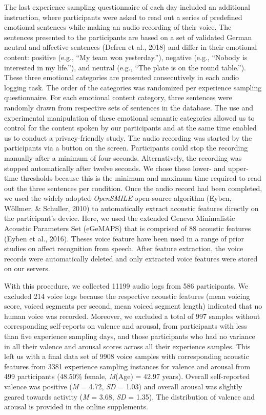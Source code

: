 \documentclass[
  man,floatsintext]{apa6}
\begin{document}
The last experience sampling questionnaire of each day included an additional instruction, where participants were asked to read out a series of predefined emotional sentences while making an audio recording of their voice. The sentences presented to the participants are based on a set of validated German neutral and affective sentences (Defren et al., 2018) and differ in their emotional content: positive (e.g., ``My team won yesterday.''), negative (e.g., ``Nobody is interested in my life.''), and neutral (e.g., ``The plate is on the round table.''). These three emotional categories are presented consecutively in each audio logging task. The order of the categories was randomized per experience sampling questionnaire. For each emotional content category, three sentences were randomly drawn from respective sets of sentences in the database. The use and experimental manipulation of these emotional semantic categories allowed us to control for the content spoken by our participants and at the same time enabled us to conduct a privacy-friendly study. The audio recording was started by the participants via a button on the screen. Participants could stop the recording manually after a minimum of four seconds. Alternatively, the recording was stopped automatically after twelve seconds. We chose these lower- and upper-time thresholds because this is the minimum and maximum time required to read out the three sentences per condition.
Once the audio record had been completed, we used the widely adopted \emph{OpenSMILE} open-source algorithm (Eyben, Wöllmer, \& Schuller, 2010) to automatically extract acoustic features directly on the participant's device. Here, we used the extended Geneva Minimalistic Acoustic Parameters Set (eGeMAPS) that is comprised of 88 acoustic features (Eyben et al., 2016). Theses voice feature have been used in a range of prior studies on affect recognition from speech. After feature extraction, the voice records were automatically deleted and only extracted voice features were stored on our servers.

With this procedure, we collected 11199 audio logs from 586 participants. We excluded 214 voice logs because the respective acoustic features (mean voicing score, voiced segments per second, mean voiced segment length) indicated that no human voice was recorded. Moreover, we excluded a total of 997 samples without corresponding self-reports on valence and arousal, from participants with less than five experience sampling days, and those participants who had no variance in all their valence and arousal scores across all their experience samples.
This left us with a final data set of 9908 voice samples with corresponding acoustic features from 3381 experience sampling instances for valence and arousal from 499 participants (48.50\% female, \emph{M}(Age) = 42.97 years). Overall self-reported valence was positive (\emph{M} = 4.72, \emph{SD} = 1.03) and overall arousal was slightly geared towards activity (\emph{M} = 3.68, \emph{SD} = 1.35). The distribution of valence and arousal is provided in the online supplements.
\end{document}
